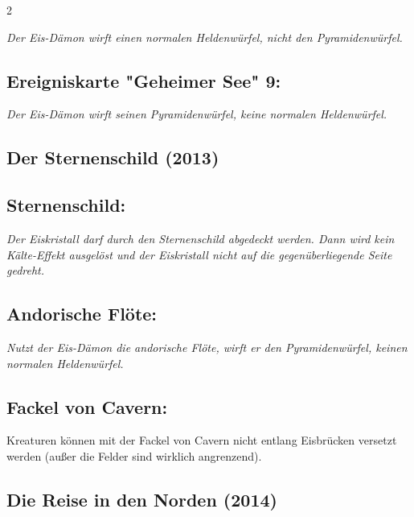 \documentclass[10pt, a4paper, oneside]{book}
\newcommand{\fan}[1]{\textit{#1}}
\begin{document}
\begin{multicols*}{2}
\begin{bgcolor}
\fan{Der Eis-Dämon wirft einen normalen Heldenwürfel, nicht den Pyramidenwürfel.}




\subsection{Ereigniskarte "Geheimer See" 9:}

\fan{Der Eis-Dämon wirft seinen Pyramidenwürfel, keine normalen Heldenwürfel.}


\end{bgcolor}




\begin{bgcolor}
\section{Der Sternenschild (2013)}

\subsection{Sternenschild:}

\fan{Der Eiskristall darf durch den Sternenschild abgedeckt werden. Dann wird kein Kälte-Effekt ausgelöst und der Eiskristall nicht auf die gegenüberliegende Seite gedreht.}



\subsection{Andorische Flöte:}

\fan{Nutzt der Eis-Dämon die andorische Flöte, wirft er den Pyramidenwürfel, keinen normalen Heldenwürfel.}



\subsection{Fackel von Cavern:}

Kreaturen können mit der Fackel von Cavern nicht entlang Eisbrücken versetzt werden (außer die Felder sind wirklich angrenzend).
\supercite{88781}


\end{bgcolor}







\begin{bgcolor}
\section{Die Reise in den Norden (2014)}


\end{bgcolor}
\end{multicols*}
\end{document}

